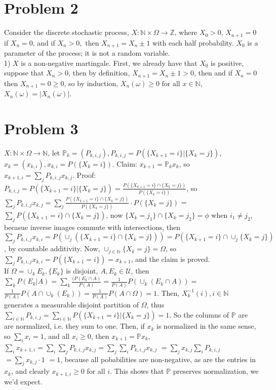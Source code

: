 \documentclass[12pt]{article}
\newcommand{\fall}[0] { \textrm{ for all } }
\newcommand{\then}[0] { \textrm{ then } }
\newcommand{\nats}[0] { \mathbb{N}}
\newcommand{\ints}[0] { \mathbb{Z}}
\newcommand{\U}[0] { \mathcal{U} }
\newcommand{\om}[0] { \omega }
\newcommand{\Om}[0] { \Omega }
\newcommand{\rarw}[0] { \rightarrow }
\begin{document}
\section*{Problem 2}

Consider the discrete stochastic process, $X: \nats \times \Om \rarw \ints$, where $X_0 > 0$, $X_{n+1} = 0$ if $X_n=0$, and if $X_n>0, \then X_{n+1} = X_n \pm 1$ with each half probability. $X_0$ is a parameter of the process; it is not a random variable.\\

1) $X$ is a non-negative martingale. First, we already have that $X_0$ is positive, suppose that $X_n > 0$, then by definition, $X_{n+1} = X_n \pm 1 > 0$, then and if $X_n = 0$ then $X_{n+1} = 0 \ge 0$, so by induction, $X_n(\om) \ge 0 \fall x\in \nats$, $X_n(\om) = |X_n(\om)|$. \\




\section*{Problem 3}

$X:\nats \times \Om \rarw \nats$, let $\mathbb{P}_k = (P_{k,i,j}), P_{k,i,j} = P(\{ X_{k+1} = i \} | \{X_k = j \})$, $x_k = (x_{k,i}), x_{k,i} = P(\{ X_k = i\})$. Claim: $x_{k+1} = \mathbb{P}_k x_k$, so $x_{k+1,i} = \sum_j P_{k,i,j} x_{k,j}$. Proof: $P_{k,i,j}  = P(\{ X_{k+1} = i \} | \{ X_k = j \}) = \frac{ P(\{ X_{k+1} = i\} \cap \{ X_k = j \}) } { P(\{X_k = i  \}) }$, so $ \sum_j P_{k,i,j} x_{k,j} = \sum_j \frac{ P(\{ X_{k+1} = i\} \cap \{ X_k = j \}) } { P(\{X_k = j  \}) } \cdot P(\{X_k = j  \}) $ = $\sum_j P(\{ X_{k+1} = i\} \cap \{ X_k = j \}) $, now  $ \{ X_{k} = j_1\} \cap \{ X_{k} = j_2\} = \phi $ when $i_1 \not = j_2$, becasue inverse images commute with intersections, then  $ \sum_j P_{k,i,j} x_{k,i}  = P \left( \cup_j \left( \{ X_{k+1} = i\} \cap \{ X_k = j \}  \right) \right) =  P \left( \{ X_{k+1} = i \}  \cap \cup_j \{ X_{k} = j\} \right)$, by countable additivity. Now, $\cup_{j \in \nats} \{ X_{k} = j\} = \Om$, so $\sum_j P_{k,i,j} x_{k,i}  =  P \left( \{ X_{k+1} = i \} \right) = x_{k+1} $, and the claim is proved. \\

If $\Om = \cup_k E_k, \{E_k \}$ is disjoint, $A, E_k \in \U$, then $\sum_k P(E_k | A ) = \sum_k \frac{(P(E_k \cap A)}{P(A)} = \frac{1}{P(A)} P \left(  \cup_k (E_k \cap A )\right) = $ 
$\frac{1}{P(A)} P \left( A \cap \cup_k (E_k  )\right) = \frac{1}{P(A)} P \left( A \cap \Om \right) = 1$. Then, $X_k^{-1}(i), i \in \nats$ generates a measurable disjoint partition of $\Om$, thus $ \sum_{i \in \nats} P_{k,i,j} = \sum_{i \in \nats} P(\{ X_{k+1} = i \} | \{X_k = j \}) = 1$. So the columns of $\mathbb{P}$ are are normalized, i.e. they sum to one. Then, if $x_k$ is normalized in the same sense, so $\sum_i x_i = 1$, and all $x_i \ge 0$, then $x_{k+1} = \mathbb{P} x_k$, $ \sum_i x_{k+1,i} = \sum_i \sum_j P_{k,i,j} x_{k,j} = \sum_j \sum_i P_{k,i,j} x_{k,j} $ $ = \sum_j  x_{k,j} \sum_i P_{k,i,j} $  $ = \sum_j  x_{k,j} \cdot 1 $ $ = 1$, because all pobabilities are non-negative, as are the entries in $x_k$, and clearly $x_{{k+1},i} \ge 0$ for all $i$. This shows that $\mathbb{P}$ preserves normalization, we we'd expect.
\end{document}
